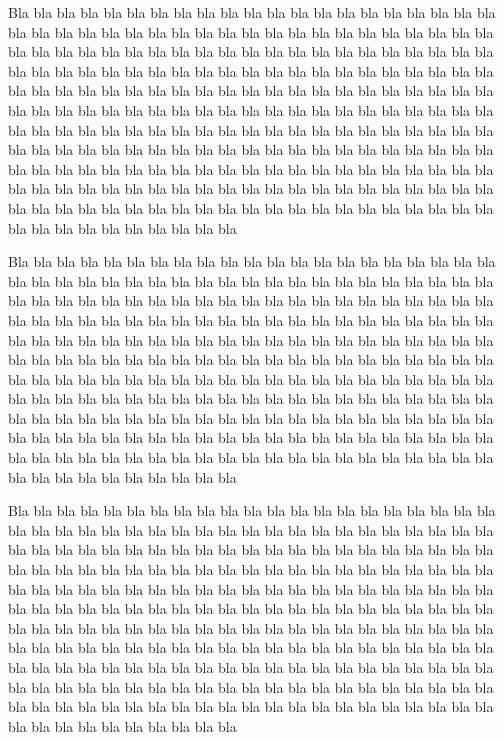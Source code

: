 \documentclass[english]{enstaPRE}
\begin{document}
\couverture


Bla bla bla bla bla bla bla bla bla bla bla bla bla bla bla bla bla bla bla bla bla bla bla bla bla bla bla bla bla bla bla bla bla bla bla bla bla bla bla bla bla bla bla bla bla bla bla bla bla bla bla bla bla bla bla bla bla bla bla bla bla bla bla bla bla bla bla bla bla bla bla bla bla bla bla bla bla bla bla bla bla bla bla bla bla bla bla bla bla bla bla bla bla bla bla bla bla bla bla bla bla bla bla bla bla bla bla bla bla bla bla bla bla bla bla bla bla bla bla bla bla bla bla bla bla bla bla bla bla bla bla bla bla bla bla bla bla bla bla bla bla bla bla bla bla bla bla bla bla bla bla bla bla bla bla bla bla bla bla bla bla bla bla bla bla bla bla bla bla bla bla bla bla bla bla bla bla bla bla bla bla bla bla bla bla bla bla bla bla bla bla bla bla bla bla bla bla bla bla bla bla bla bla bla bla bla bla bla bla bla bla bla bla bla bla bla bla bla bla bla bla bla bla bla bla bla bla bla bla bla bla bla bla bla bla bla bla bla bla bla bla

Bla bla bla bla bla bla bla bla bla bla bla bla bla bla bla bla bla bla bla bla bla bla bla bla bla bla bla bla bla bla bla bla bla bla bla bla bla bla bla bla bla bla bla bla bla bla bla bla bla bla bla bla bla bla bla bla bla bla bla bla bla bla bla bla bla bla bla bla bla bla bla bla bla bla bla bla bla bla bla bla bla bla bla bla bla bla bla bla bla bla bla bla bla bla bla bla bla bla bla bla bla bla bla bla bla bla bla bla bla bla bla bla bla bla bla bla bla bla bla bla bla bla bla bla bla bla bla bla bla bla bla bla bla bla bla bla bla bla bla bla bla bla bla bla bla bla bla bla bla bla bla bla bla bla bla bla bla bla bla bla bla bla bla bla bla bla bla bla bla bla bla bla bla bla bla bla bla bla bla bla bla bla bla bla bla bla bla bla bla bla bla bla bla bla bla bla bla bla bla bla bla bla bla bla bla bla bla bla bla bla bla bla bla bla bla bla bla bla bla bla bla bla bla bla bla bla bla bla bla bla bla bla bla bla bla bla bla bla bla bla bla

\tableofcontents

Bla bla bla bla bla bla bla bla bla bla bla bla bla bla bla bla bla bla bla bla bla bla bla bla bla bla bla bla bla bla bla bla bla bla bla bla bla bla bla bla bla bla bla bla bla bla bla bla bla bla bla bla bla bla bla bla bla bla bla bla bla bla bla bla bla bla bla bla bla bla bla bla bla bla bla bla bla bla bla bla bla bla bla bla bla bla bla bla bla bla bla bla bla bla bla bla bla bla bla bla bla bla bla bla bla bla bla bla bla bla bla bla bla bla bla bla bla bla bla bla bla bla bla bla bla bla bla bla bla bla bla bla bla bla bla bla bla bla bla bla bla bla bla bla bla bla bla bla bla bla bla bla bla bla bla bla bla bla bla bla bla bla bla bla bla bla bla bla bla bla bla bla bla bla bla bla bla bla bla bla bla bla bla bla bla bla bla bla bla bla bla bla bla bla bla bla bla bla bla bla bla bla bla bla bla bla bla bla bla bla bla bla bla bla bla bla bla bla bla bla bla bla bla bla bla bla bla bla bla bla bla bla bla bla bla bla bla bla bla bla bla
\end{document}
